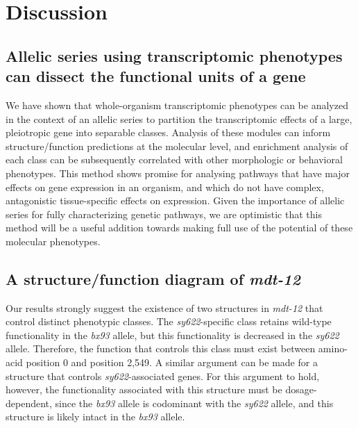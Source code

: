 \documentclass[10pt, twocolumn]{article}
\newcommand{\cel}{\emph{C.~elegans}}
\newcommand{\gene}[1]{\mbox{\emph{#1}}}
\newcommand{\dpy}{\gene{mdt-12}}
\begin{document}
%


\section*{Discussion}
\label{sec:conclusions}
\subsection*{Allelic series using transcriptomic phenotypes can dissect the
             functional units of a gene}
We have shown that whole-organism transcriptomic phenotypes can be analyzed in
the context of an allelic series to partition the transcriptomic effects of a
large, pleiotropic gene into separable classes. Analysis of these modules can
inform structure/function predictions at the molecular level, and enrichment
analysis of each class can be subsequently correlated with other morphologic or
behavioral phenotypes. This method shows promise for analysing pathways that
have major effects on gene expression in an organism, and which do not have
complex, antagonistic tissue-specific effects on expression. Given the
importance of allelic series for fully characterizing genetic pathways, we are
optimistic that this method will be a useful addition towards making full use of
the potential of these molecular phenotypes.

\subsection*{A structure/function diagram of \dpy{}}
Our results strongly suggest the existence of two structures in \dpy{} that
control distinct phenotypic classes. The \emph{sy622}-specific class retains
wild-type functionality in the \emph{bx93} allele, but this functionality is
decreased in the \emph{sy622} allele. Therefore, the function that controls this
class must exist between amino-acid position 0 and position 2,549. A similar
argument can be made for a structure that controls \emph{sy622}-associated
genes. For this argument to hold, however, the functionality associated with this
structure must be dosage-dependent, since the \emph{bx93} allele is codominant
with the \emph{sy622} allele, and this structure is likely intact in the
\emph{bx93} allele.
\end{document}
